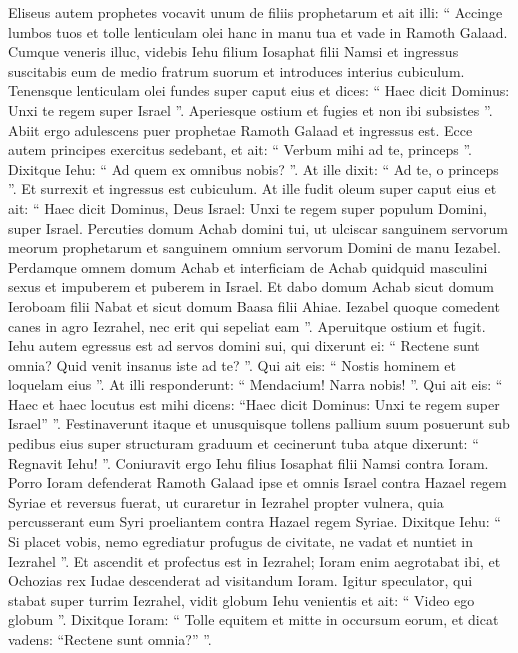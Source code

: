 \begin{biblechapter}
\begin{biblechapter}
\begin{biblechapter}
\begin{biblechapter}
\begin{biblechapter}
\begin{biblechapter}
\begin{biblechapter}
\begin{biblechapter}
\begin{biblechapter}
 \verse Eliseus autem prophetes vocavit unum de filiis prophetarum et ait illi: “ Accinge lumbos tuos et tolle lenticulam olei hanc in manu tua et vade in Ramoth Galaad. 
\verse Cumque veneris illuc, videbis Iehu filium Iosaphat filii Namsi et ingressus suscitabis eum de medio fratrum suorum et introduces interius cubiculum. 
\verse Tenensque lenticulam olei fundes super caput eius et dices: “ Haec dicit Dominus: Unxi te regem super Israel ”. Aperiesque ostium et fugies et non ibi subsistes ”.
 \verse Abiit ergo adulescens puer prophetae Ramoth Galaad 
\verse et ingressus est. Ecce autem principes exercitus sedebant, et ait: “ Verbum mihi ad te, princeps ”. Dixitque Iehu: “ Ad quem ex omnibus nobis? ”. At ille dixit: “ Ad te, o princeps ”. 
\verse Et surrexit et ingressus est cubiculum. At ille fudit oleum super caput eius et ait: “ Haec dicit Dominus, Deus Israel: Unxi te regem super populum Domini, super Israel. 
\verse Percuties domum Achab domini tui, ut ulciscar sanguinem servorum meorum prophetarum et sanguinem omnium servorum Domini de manu Iezabel. 
\verse Perdamque omnem domum Achab et interficiam de Achab quidquid masculini sexus et impuberem et puberem in Israel. 
\verse Et dabo domum Achab sicut domum Ieroboam filii Nabat et sicut domum Baasa filii Ahiae. 
 \verse Iezabel quoque comedent canes in agro Iezrahel, nec erit qui sepeliat eam ”. Aperuitque ostium et fugit.
 \verse Iehu autem egressus est ad servos domini sui, qui dixerunt ei: “ Rectene sunt omnia? Quid venit insanus iste ad te? ”. Qui ait eis: “ Nostis hominem et loquelam eius ”. 
\verse At illi responderunt: “ Mendacium! Narra nobis! ”. Qui ait eis: “ Haec et haec locutus est mihi dicens: “Haec dicit Dominus: Unxi te regem super Israel” ”. 
\verse Festinaverunt itaque et unusquisque tollens pallium suum posuerunt sub pedibus eius super structuram graduum et cecinerunt tuba atque dixerunt: “ Regnavit Iehu! ”.
 \verse Coniuravit ergo Iehu filius Iosaphat filii Namsi contra Ioram. Porro Ioram defenderat Ramoth Galaad ipse et omnis Israel contra Hazael regem Syriae 
\verse et reversus fuerat, ut curaretur in Iezrahel propter vulnera, quia percusserant eum Syri proeliantem contra Hazael regem Syriae. Dixitque Iehu: “ Si placet vobis, nemo egrediatur profugus de civitate, ne vadat et nuntiet in Iezrahel ”. 
 \verse Et ascendit et profectus est in Iezrahel; Ioram enim aegrotabat ibi, et Ochozias rex Iudae descenderat ad visitandum Ioram.
 \verse Igitur speculator, qui stabat super turrim Iezrahel, vidit globum Iehu venientis et ait: “ Video ego globum ”. Dixitque Ioram: “ Tolle equitem et mitte in occursum eorum, et dicat vadens: “Rectene sunt omnia?” ”. 

\end{biblechapter}
\end{biblechapter}
\end{biblechapter}
\end{biblechapter}
\end{biblechapter}
\end{biblechapter}
\end{biblechapter}
\end{biblechapter}
\end{biblechapter}
